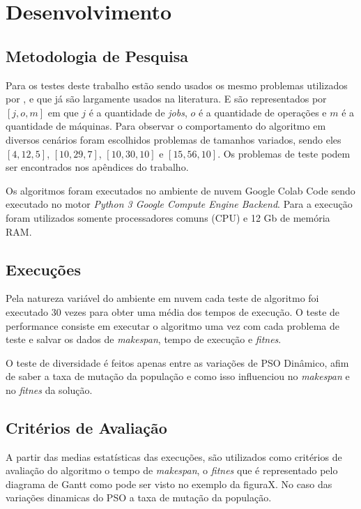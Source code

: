 \chapter{Desenvolvimento}

\section{Metodologia de Pesquisa}

Para os testes deste trabalho estão sendo usados os mesmo problemas utilizados por \cite{Kacem2002}, e que já são largamente usados na literatura. E são representados por $[j, o, m]$ em que $j$ é a quantidade de \textit{jobs}, $o$ é a quantidade de operações e $m$ é a quantidade de máquinas. Para observar o comportamento do algoritmo em diversos cenários foram escolhidos problemas de tamanhos variados, sendo eles $[4, 12, 5]$, $[10, 29, 7]$, $[10, 30, 10]$ e $[15, 56, 10]$. Os problemas de teste podem ser encontrados nos apêndices do trabalho.
\newline

Os algoritmos foram executados no ambiente de nuvem Google Colab Code sendo executado no motor \textit{Python 3 Google Compute Engine Backend}. Para a execução foram utilizados somente processadores comuns (CPU) e 12 Gb de memória RAM.

\section{Execuções}
Pela natureza variável do ambiente em nuvem cada teste de algoritmo foi executado 30 vezes para obter uma média dos tempos de execução. O teste de performance consiste em executar o algoritmo uma vez com cada problema de teste e salvar os dados de \textit{makespan}, tempo de execução e \textit{fitnes}.

O teste de diversidade é feitos apenas entre as variações de PSO Dinâmico, afim de saber a taxa de mutação da população e como isso influenciou no \textit{makespan} e no \textit{fitnes} da solução.

\section{Critérios de Avaliação}
A partir das medias estatísticas das execuções, são utilizados como critérios de avaliação do algoritmo o tempo de \textit{makespan}, o \textit{fitnes} que é representado pelo diagrama de Gantt como pode ser visto no exemplo da figuraX. No caso das variações dinamicas do PSO a taxa de mutação da população.

